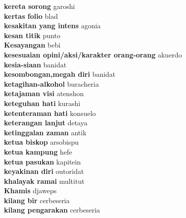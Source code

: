 \textbf{ kereta sorong  } garoshi \\
\textbf{ kertas folio  } blad \\
\textbf{ kesakitan yang intens  } agonia \\
\textbf{ kesan titik  } punto \\
\textbf{ Kesayangan  } bebi \\
\textbf{ kesesuaian opini/aksi/karakter orang-orang  } akuerdo \\
\textbf{ kesia-siaan  } banidat \\
\textbf{ kesombongan,megah diri  } banidat \\
\textbf{ ketagihan-alkohol  } buracheria \\
\textbf{ ketajaman visi  } atenshon \\
\textbf{ keteguhan hati  } kurashi \\
\textbf{ ketenteraman hati  } konsuelo \\
\textbf{ keterangan lanjut  } detaya \\
\textbf{ ketinggalan zaman  } antik \\
\textbf{ ketua biskop  } arsobispu \\
\textbf{ ketua kampung  } hefe \\
\textbf{ ketua pasukan  } kapitein \\
\textbf{ keyakinan diri  } outoridat \\
\textbf{ khalayak ramai  } multitut \\
\textbf{ Khamis  } djaweps \\
\textbf{ kilang bir  } cerbeseria \\
\textbf{ kilang pengarakan  } cerbeseria \\
